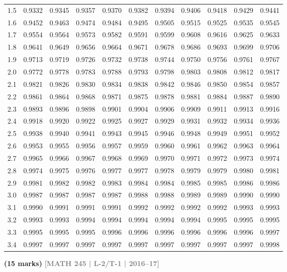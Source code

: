 \documentclass[12pt,a4paper]{article}
\newcommand{\yr}[1]{\hfill\textcolor{gray}{\small\textbf{[#1]}}}
\newcommand{\mk}[1]{\textcolor{orange!70!black}{\small\textbf{(#1 marks)}}}
\begin{document}
\begin{enumerate}
\begin{center}
\begin{longtable}{ccccccccccc}
1.5 & 0.9332 & 0.9345 & 0.9357 & 0.9370 & 0.9382 & 0.9394 & 0.9406 & 0.9418 & 0.9429 & 0.9441 \\
1.6 & 0.9452 & 0.9463 & 0.9474 & 0.9484 & 0.9495 & 0.9505 & 0.9515 & 0.9525 & 0.9535 & 0.9545 \\
1.7 & 0.9554 & 0.9564 & 0.9573 & 0.9582 & 0.9591 & 0.9599 & 0.9608 & 0.9616 & 0.9625 & 0.9633 \\
1.8 & 0.9641 & 0.9649 & 0.9656 & 0.9664 & 0.9671 & 0.9678 & 0.9686 & 0.9693 & 0.9699 & 0.9706 \\
1.9 & 0.9713 & 0.9719 & 0.9726 & 0.9732 & 0.9738 & 0.9744 & 0.9750 & 0.9756 & 0.9761 & 0.9767 \\
2.0 & 0.9772 & 0.9778 & 0.9783 & 0.9788 & 0.9793 & 0.9798 & 0.9803 & 0.9808 & 0.9812 & 0.9817 \\
2.1 & 0.9821 & 0.9826 & 0.9830 & 0.9834 & 0.9838 & 0.9842 & 0.9846 & 0.9850 & 0.9854 & 0.9857 \\
2.2 & 0.9861 & 0.9864 & 0.9868 & 0.9871 & 0.9875 & 0.9878 & 0.9881 & 0.9884 & 0.9887 & 0.9890 \\
2.3 & 0.9893 & 0.9896 & 0.9898 & 0.9901 & 0.9904 & 0.9906 & 0.9909 & 0.9911 & 0.9913 & 0.9916 \\
2.4 & 0.9918 & 0.9920 & 0.9922 & 0.9925 & 0.9927 & 0.9929 & 0.9931 & 0.9932 & 0.9934 & 0.9936 \\
2.5 & 0.9938 & 0.9940 & 0.9941 & 0.9943 & 0.9945 & 0.9946 & 0.9948 & 0.9949 & 0.9951 & 0.9952 \\
2.6 & 0.9953 & 0.9955 & 0.9956 & 0.9957 & 0.9959 & 0.9960 & 0.9961 & 0.9962 & 0.9963 & 0.9964 \\
2.7 & 0.9965 & 0.9966 & 0.9967 & 0.9968 & 0.9969 & 0.9970 & 0.9971 & 0.9972 & 0.9973 & 0.9974 \\
2.8 & 0.9974 & 0.9975 & 0.9976 & 0.9977 & 0.9977 & 0.9978 & 0.9979 & 0.9979 & 0.9980 & 0.9981 \\
2.9 & 0.9981 & 0.9982 & 0.9982 & 0.9983 & 0.9984 & 0.9984 & 0.9985 & 0.9985 & 0.9986 & 0.9986 \\
3.0 & 0.9987 & 0.9987 & 0.9987 & 0.9987 & 0.9988 & 0.9988 & 0.9989 & 0.9989 & 0.9990 & 0.9990 \\
3.1 & 0.9990 & 0.9991 & 0.9991 & 0.9991 & 0.9992 & 0.9992 & 0.9992 & 0.9992 & 0.9993 & 0.9993 \\
3.2 & 0.9993 & 0.9993 & 0.9994 & 0.9994 & 0.9994 & 0.9994 & 0.9994 & 0.9995 & 0.9995 & 0.9995 \\
3.3 & 0.9995 & 0.9995 & 0.9995 & 0.9996 & 0.9996 & 0.9996 & 0.9996 & 0.9996 & 0.9996 & 0.9997 \\
3.4 & 0.9997 & 0.9997 & 0.9997 & 0.9997 & 0.9997 & 0.9997 & 0.9997 & 0.9997 & 0.9997 & 0.9998 \\
\end{longtable}
\end{center}

\mk{15} \yr{MATH 245 | L-2/T-1 | 2016--17}

\end{enumerate}
\end{document}
